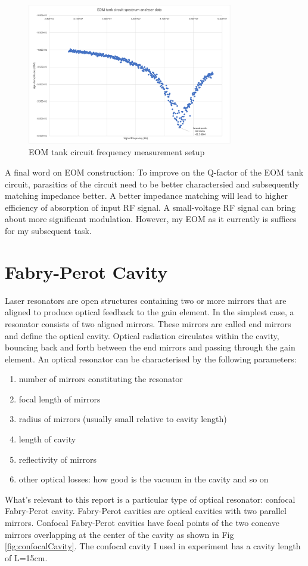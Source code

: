 \documentclass[11pt,A4Paper]{article}
\begin{document}
\begin{figure}[H]
    \centering
    \includegraphics[width=0.8\textwidth]{EOMfrequencyMeasurement.png}
    \caption{EOM tank circuit frequency measurement setup}
    \label{fig:EOMfrequencyMeasurement}
\end{figure}

A final word on EOM construction: To improve on the Q-factor of the EOM tank circuit, parasitics of the circuit need to be better charactersied and subsequently matching impedance better. A better impedance matching will lead to higher efficiency of absorption of input RF signal. A small-voltage RF signal can bring about more significant modulation. However, my EOM as it currently is suffices for my subsequent task. 

\section{Fabry-Perot Cavity}
Laser resonators are open structures containing two or more mirrors that are aligned to produce optical feedback to the gain element. In the simplest case, a resonator consists of two aligned mirrors. These mirrors are called end mirrors and define the optical cavity. Optical radiation circulates within the cavity, bouncing back and forth between the end mirrors and passing through the gain element. An optical resonator can be characterised by the following parameters: 
\begin{enumerate}
    \item number of mirrors constituting the resonator
    \item focal length of mirrors
    \item radius of mirrors (usually small relative to cavity length)
    \item length of cavity
    \item reflectivity of mirrors
    \item other optical losses: how good is the vacuum in the cavity and so on
\end{enumerate}
What's relevant to this report is a particular type of optical resonator: confocal Fabry-Perot cavity. Fabry-Perot cavities are optical cavities with two parallel mirrors. Confocal Fabry-Perot cavities have focal points of the two concave mirrors overlapping at the center of the cavity as shown in Fig \ref{fig:confocalCavity}. The confocal cavity I used in experiment has a cavity length of L=15cm. 
\end{document}
